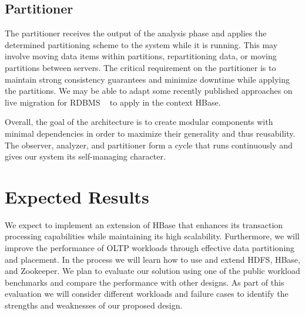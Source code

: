 \documentclass[10pt,final,journal]{IEEEtran}
\begin{document}
\subsection{Partitioner}
The partitioner receives the output of the analysis phase and applies the determined partitioning scheme to the system while it is running. This may involve moving data items within partitions, repartitioning data, or moving partitions between servers. The critical requirement on the partitioner is to maintain strong consistency guarantees and minimize downtime while applying the partitions. We may be able to adapt some recently published approaches on live migration for RDBMS ~\cite{Das:2011:ALE:2002974.2002977, Elmore:2011} to apply in the context HBase.

Overall, the goal of the architecture is to create modular components with minimal dependencies in order to maximize their generality and thus reusability. The observer, analyzer, and partitioner form a cycle that runs continuously and gives our system its self-managing character.

\section{Expected Results}
We expect to implement an extension of HBase that enhances its transaction processing capabilities while maintaining its high scalability. Furthermore, we will improve the performance of OLTP workloads through effective data partitioning and placement. In the process we will learn how to use and extend HDFS, HBase, and Zookeeper. We plan to evaluate our solution using one of the public workload benchmarks and compare the performance with other designs. As part of this evaluation we will consider different workloads and failure cases to identify the strengths and weaknesses of our proposed design.



\end{document}
